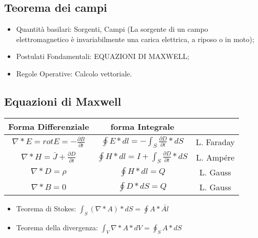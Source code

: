 \documentclass{book}
\begin{document}
\subsection{Teorema dei campi}
\begin{itemize}
\item Quantità basilari: Sorgenti, Campi (La sorgente di un
  campo elettromagnetico è invariabilmente una carica elettrica, a riposo o in moto);
\item Postulati Fondamentali: EQUAZIONI DI MAXWELL;
\item Regole Operative: Calcolo vettoriale.
\end{itemize}
\subsection{Equazioni di Maxwell}
\begin{table}[ht]
  \centering
    \begin{tabular}{|c|c|c|}
        \hline
        Forma Differenziale & forma Integrale &\\\hline
        $\nabla * E = rot E = - \frac{\partial B}{\partial t}$ & $\oint E*dl=-\int_S\frac{\partial D}{\partial t}*dS$ & L. Faraday \\
        $\nabla * H = \bar{J}+ \frac{\partial D}{\partial t}$
        & $\oint H*dl=I+\int_S\frac{\partial D}{\partial t} * dS$
                                                                                                                        & L. Ampére\\
        $\nabla*D=\rho$ & $\oint H*dl=Q$ & L. Gauss\\
        $\nabla*B=0$ & $\oint D*dS=Q$ & L. Gauss\\\hline
    \end{tabular}
\end{table}
\begin{itemize}
    \item Teorema di Stokes: $\int_S(\nabla* A)*dS = \oint A*\bar{Al}$
    \item Teorema della divergenza: $\int_V\nabla*A*dV=\oint_SA*dS$
\end{itemize}
\end{document}
